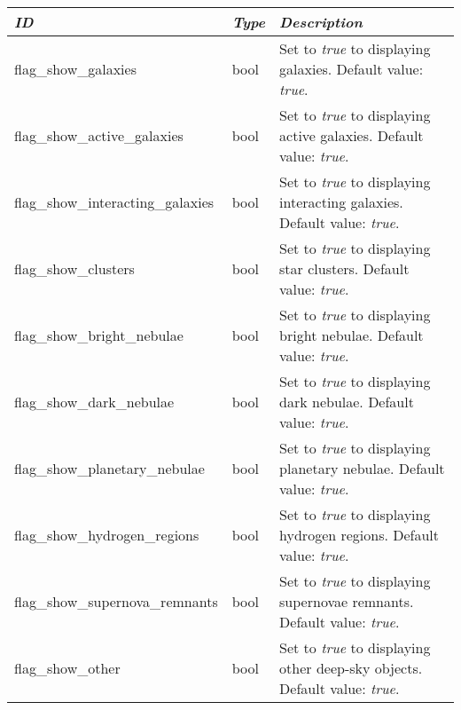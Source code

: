 \begin{longtabu} to \textwidth {l|l|X}
\toprule
\emph{ID} & \emph{Type} & \emph{Description}\\
\midrule
flag\_show\_galaxies & bool & Set to \emph{true}
to displaying galaxies. Default value: \emph{true}. \\
\midrule
flag\_show\_active\_galaxies & bool & Set to
\emph{true} to displaying active galaxies. Default value: \emph{true}. \\
\midrule
flag\_show\_interacting\_galaxies & bool & Set
to \emph{true} to displaying interacting galaxies. Default value: \emph{true}. \\
\midrule
flag\_show\_clusters & bool & Set to \emph{true}
to displaying star clusters. Default value: \emph{true}. \\
\midrule
flag\_show\_bright\_nebulae & bool & Set to
\emph{true} to displaying bright nebulae. Default value: \emph{true}. \\
\midrule
flag\_show\_dark\_nebulae & bool & Set to
\emph{true} to displaying dark nebulae. Default value: \emph{true}. \\
\midrule
flag\_show\_planetary\_nebulae & bool & Set to
\emph{true} to displaying planetary nebulae. Default value: \emph{true}. \\
\midrule
flag\_show\_hydrogen\_regions & bool & Set to
\emph{true} to displaying hydrogen regions. Default value: \emph{true}. \\
\midrule
flag\_show\_supernova\_remnants & bool & Set to
\emph{true} to displaying supernovae remnants. Default value: \emph{true}. \\
\midrule
flag\_show\_other & bool & Set to \emph{true} to
displaying other deep-sky objects. Default value: \emph{true}. \\
\bottomrule
\end{longtabu}

\section{}\label{section-gui}


